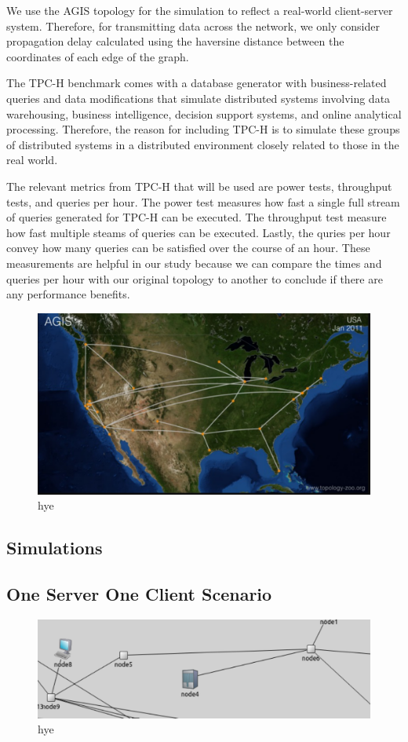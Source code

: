 \indent We use the AGIS topology for the simulation to reflect a real-world client-server system. Therefore, for transmitting data across the network, we only consider propagation delay calculated using the haversine distance between the coordinates of each edge of the graph.

\indent The TPC-H benchmark comes with a database generator with business-related queries and data modifications that simulate distributed systems involving data warehousing, business intelligence, decision support systems, and online analytical processing. Therefore, the reason for including TPC-H is to simulate these groups of distributed systems in a distributed environment closely related to those in the real world.

\indent The relevant metrics from TPC-H that will be used are power tests, throughput tests, and queries per hour. The power test measures how fast a single full stream of queries generated for TPC-H can be executed. The throughput test measure how fast multiple steams of queries can be executed. Lastly, the quries per hour convey how many queries can be satisfied over the course of an hour. These measurements are helpful in our study because we can compare the times and queries per hour with our original topology to another to conclude if there are any performance benefits.

\begin{figure}[tp]
\centering
\includegraphics[width=0.5 \textwidth]{figures/AGIS_ORIG}
\caption{hye}
\end{figure}

\subsection{Simulations}

\subsection{One Server One Client Scenario}

\begin{figure}[tp]
\centering
\includegraphics[width=0.5 \textwidth]{figures/SingleClientOrig}
\caption{hye}
\end{figure}

